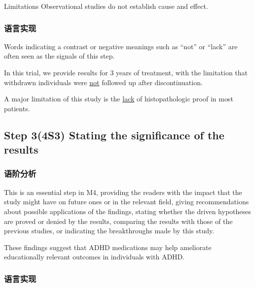 \documentclass[a4paper]{ctexbook}
\begin{document}
    \begin{eg}{}
      Limitations Observational studies do not establish cause and effect.
    \end{eg}

    \subsubsection{语言实现}

    Words indicating a contrast or negative meanings such as ``not'' or ``lack'' are often seen as the signals of this step.

    \begin{eg}{}
      In this trial, we provide results for 3 years of treatment, with the limitation that withdrawn individuals were \uline{not} followed up after discontinuation.   
    \end{eg}

    \begin{eg}{}
      A major limitation of this study is the \uline{lack} of histopathologic proof in most patients.     
    \end{eg}

  \subsection{Step 3(4S3) Stating the significance of the results}
    \subsubsection{语阶分析}

    This is an essential step in M4, providing the readers with the impact that the study might have on future ones or in the relevant field, giving recommendations about possible applications of the findings, stating whether the driven hypotheses are proved or denied by the results, comparing the results with those of the previous studies, or indicating the breakthroughs made by this study.

    \begin{eg}{}
      These findings suggest that ADHD medications may help ameliorate educationally relevant outcomes in individuals with ADHD.
    \end{eg}

    \subsubsection{语言实现}
\end{document}
